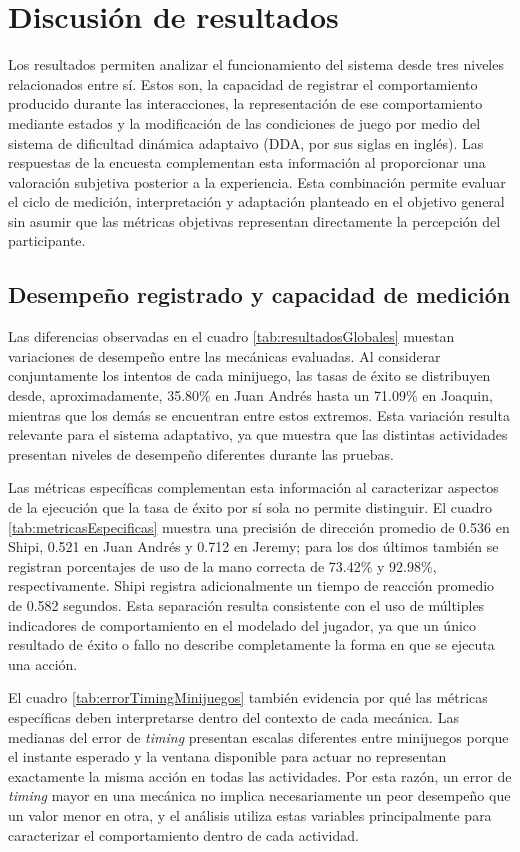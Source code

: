 \chapter{Discusión de resultados}
Los resultados permiten analizar el funcionamiento del sistema desde
tres niveles relacionados entre sí. Estos son, la capacidad de registrar
el comportamiento producido durante las interacciones, la representación
de ese comportamiento mediante estados y la modificación de las condiciones
de juego por medio del sistema de dificultad dinámica adaptaivo 
(DDA, por sus siglas en inglés). Las respuestas de la encuesta complementan esta 
información al proporcionar una valoración subjetiva posterior a la 
experiencia. Esta combinación permite evaluar el ciclo de medición,
interpretación y adaptación planteado en el objetivo general sin asumir 
que las métricas objetivas representan directamente la percepción del 
participante.

\section{Desempeño registrado y capacidad de medición}
Las diferencias observadas en el cuadro \ref{tab:resultadosGlobales} 
muestan variaciones de desempeño entre las mecánicas evaluadas.
Al considerar conjuntamente los intentos de cada minijuego, las tasas de
éxito se distribuyen desde, aproximadamente, 35.80\% en Juan Andrés hasta
un 71.09\% en Joaquin, mientras que los demás se encuentran entre estos 
extremos. Esta variación resulta relevante para el sistema adaptativo, 
ya que muestra que las distintas actividades presentan niveles de 
desempeño diferentes durante las pruebas.

Las métricas específicas complementan esta información al caracterizar
aspectos de la ejecución que la tasa de éxito por sí sola no permite
distinguir. El cuadro \ref{tab:metricasEspecificas} muestra una precisión 
de dirección promedio de 0.536 en Shipi, 0.521 en Juan Andrés y 0.712 en 
Jeremy; para los dos últimos también se registran porcentajes de uso de 
la mano correcta de 73.42\% y 92.98\%, respectivamente. Shipi registra 
adicionalmente un tiempo de reacción promedio de 0.582 segundos. Esta 
separación resulta consistente con el uso de múltiples indicadores de 
comportamiento en el modelado del jugador, ya que un único resultado de 
éxito o fallo no describe completamente la forma en que se ejecuta una 
acción.

El cuadro \ref{tab:errorTimingMinijuegos} también evidencia por qué las 
métricas específicas deben interpretarse dentro del contexto de cada 
mecánica. Las medianas del error de \textit{timing} presentan escalas 
diferentes entre minijuegos porque el instante esperado y la ventana 
disponible para actuar no representan exactamente la misma acción en 
todas las actividades. Por esta razón, un error de \textit{timing} mayor 
en una mecánica no implica necesariamente un peor desempeño que un valor 
menor en otra, y el análisis utiliza estas variables principalmente para 
caracterizar el comportamiento dentro de cada actividad.

